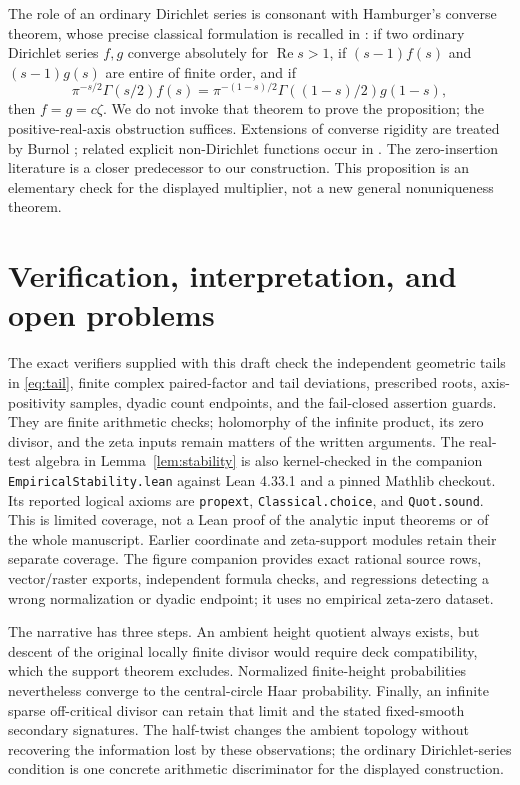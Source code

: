 \documentclass[11pt,a4paper]{article}
\theoremstyle{definition}
\theoremstyle{remark}
\DeclareMathOperator{\Rea}{Re}
\begin{document}
The role of an ordinary Dirichlet series is consonant with Hamburger's
converse theorem, whose precise classical formulation is recalled in
\cite[Introduction]{KMP}: if two ordinary Dirichlet series $f,g$ converge
absolutely for $\Rea s>1$, if $(s-1)f(s)$ and $(s-1)g(s)$ are entire of
finite order, and if
\[
 \pi^{-s/2}\Gamma(s/2)f(s)
 =\pi^{-(1-s)/2}\Gamma((1-s)/2)g(1-s),
\]
then $f=g=c\zeta$. We do not invoke that theorem to prove the proposition; the
positive-real-axis obstruction suffices. Extensions of converse rigidity are treated by Burnol \cite{Burnol};
related explicit non-Dirichlet functions occur in \cite{Nakamura}. The
zero-insertion literature \cite{GZ,GX} is a closer predecessor to our
construction. This proposition is an elementary check for the displayed
multiplier, not a new general nonuniqueness theorem.

\section{Verification, interpretation, and open problems}\label{sec:outlook}

The exact verifiers supplied with this draft check the independent geometric
tails in \eqref{eq:tail}, finite complex paired-factor and tail deviations,
prescribed roots, axis-positivity samples, dyadic count endpoints, and the
fail-closed assertion guards. They are finite arithmetic checks; holomorphy
of the infinite product, its zero divisor, and the zeta inputs remain matters
of the written arguments. The real-test algebra in Lemma~\ref{lem:stability}
is also kernel-checked in the companion \texttt{EmpiricalStability.lean}
against Lean 4.33.1 and a pinned Mathlib checkout. Its reported logical
axioms are \texttt{propext}, \texttt{Classical.choice}, and
\texttt{Quot.sound}. This is limited coverage, not a Lean proof of the
analytic input theorems or of the whole manuscript. Earlier coordinate and
zeta-support modules retain their separate coverage. The figure companion
provides exact rational source rows, vector/raster exports, independent
formula checks, and regressions detecting a wrong normalization or dyadic
endpoint; it uses no empirical zeta-zero dataset.

The narrative has three steps. An ambient height quotient always exists, but
descent of the original locally finite divisor would require deck
compatibility, which the support theorem excludes. Normalized finite-height
probabilities nevertheless converge to the central-circle Haar probability.
Finally, an infinite sparse off-critical divisor can retain that limit and
the stated fixed-smooth secondary signatures. The half-twist changes the
ambient topology without recovering the information lost by these
observations; the ordinary Dirichlet-series condition is one concrete
arithmetic discriminator for the displayed construction.
\end{document}
